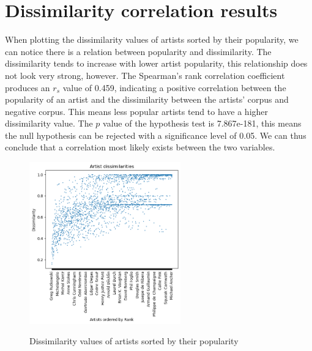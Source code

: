 \section{Dissimilarity correlation results}

When plotting the dissimilarity values of artists sorted by their popularity, we can notice there is a relation between popularity and dissimilarity. The dissimilarity tends to increase with lower artist popularity, this relationship does not look very strong, however.
The Spearman's rank correlation coefficient produces an \(r_s\) value of 0.459, indicating a positive correlation between the popularity of an artist and the dissimilarity between the artists' corpus and negative corpus. This means less popular artists tend to have a higher dissimilarity value.
The \(p\) value of the hypothesis test is 7.867e-181, this means the null hypothesis can be rejected with a significance level of 0.05. We can thus conclude that a correlation most likely exists between the two variables.


\begin{figure}[h]
    \begin{center}
        \includegraphics[height=7cm]{Bilder/ranked_artist_dissimilarity.png}\\[2.5ex]
    \end{center}
\caption{Dissimilarity values of artists sorted by their popularity}
\end{figure}





